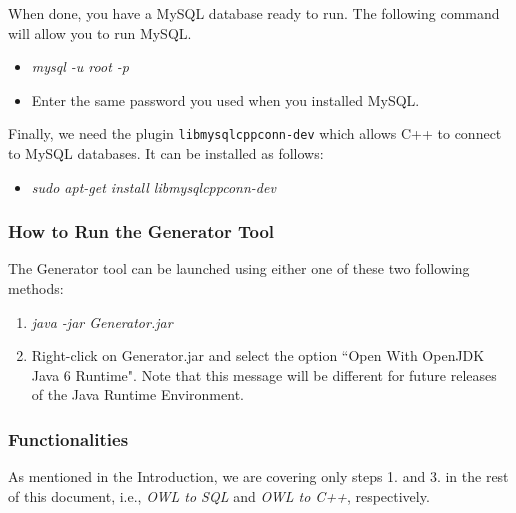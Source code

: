 When done, you have a MySQL database ready to run. The following command will allow you to run MySQL.

\begin{itemize}
 \item \textit{mysql -u root -p}
 \item Enter the same password you used when you installed MySQL.
\end{itemize}

Finally, we need the plugin \texttt{libmysqlcppconn-dev} which allows C++ to connect to MySQL databases. It can be installed as follows:
\begin{itemize}
 \item \textit{sudo apt-get install libmysqlcppconn-dev}
\end{itemize}

\subsubsection{How to Run the Generator Tool}\label{s:run}
The Generator tool can be launched using either one of these two following methods:
\begin{enumerate}
 \item \textit{java -jar Generator.jar}
 \item Right-click on Generator.jar and select the option ``Open With OpenJDK Java 6 Runtime". Note that this message will be different for future releases of the Java Runtime Environment.
\end{enumerate}


\subsubsection{Functionalities}\label{s:generator}
As mentioned in the Introduction, we are covering only steps 1. and 3. in the rest of this document, i.e., \textit{OWL to SQL} and \textit{OWL to C++}, respectively.

